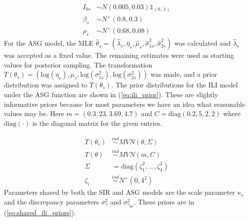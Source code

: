 \documentclass[ba]{imsart}
\theoremstyle{plain}
\theoremstyle{definition}
\theoremstyle{remark}
\begin{document}
\begin{equation}
\begin{aligned}
    \label{eq:sir_prior}
        I_{0s} &\sim N(0.005, 0.03) \mathbb{1}_{(0, .1)} \\
        \beta_s &\sim N^+(0.8, 0.3) \\
        \rho_s &\sim N^+(0.68, 0.08)
\end{aligned}
\end{equation}
For the ASG model, the MLE $\hat{\theta}_s = (\hat{\lambda}_s, \hat{\eta}_s, \hat{\mu}_s, \hat{\sigma}_{1s}^2, \hat{\sigma}_{2s}^2)$ was calculated and $\hat{\lambda}_s$ was accepted as a fixed value. The remaining estimates were used as starting values for posterior sampling. The transformation $T(\theta_s) = (\text{log}(\eta_s), \mu_s, \text{log}(\sigma_{1s}^2), \text{log}(\sigma_{2s}^2))$ was made, and a prior distribution was assigned to $T(\theta_s)$.
The prior distributions for the ILI model under the ASG function are shown in (\ref{eq:ili_prior}). These are slightly informative priors because for most parameters we have an idea what reasonable values may be. Here $m = (0.3, 23, 3.69, 4.7)$ and $C = \text{diag}(0.2, 5, 2, 2)$
where $\text{diag}(\cdot)$ 
is the diagonal matrix for the given entries.


\begin{equation}
\begin{aligned}
\label{eq:ili_prior}
                T(\theta_s) &\overset{ind}{\sim} MVN(\theta, \Sigma) \\
                T(\theta) &\overset{ind}{\sim} MVN(m, C)\\
                \Sigma &= \text{diag}(\zeta^2_1,...,\zeta^2_4) \\
                \zeta_i &\overset{ind}{\sim} N^+(0,4^2)
\end{aligned}
\end{equation}
Parameters shared by both the SIR and ASG models are the scale parameter $\kappa_s$ and the discrepancy parameters $\sigma_{\gamma}^2$ and $\sigma_{\gamma_W}^2$. These priors are in (\ref{eq:shared_ili_priors}). 
\end{document}
